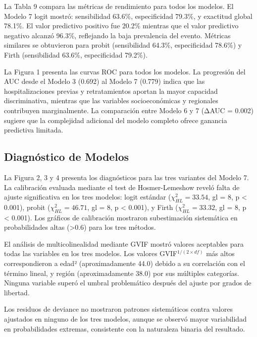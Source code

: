 \documentclass[
  spanish,
  10pt,
]{article}
\begin{document}
La Tabla 9 compara las métricas de rendimiento para todos los modelos.
El Modelo 7 logit mostró: sensibilidad 63.6\%, especificidad 79.3\%, y
exactitud global 78.1\%. El valor predictivo positivo fue 20.2\%
mientras que el valor predictivo negativo alcanzó 96.3\%, reflejando la
baja prevalencia del evento. Métricas similares se obtuvieron para
probit (sensibilidad 64.3\%, especificidad 78.6\%) y Firth (sensibilidad
63.6\%, especificidad 79.2\%).

La Figura 1 presenta las curvas ROC para todos los modelos. La
progresión del AUC desde el Modelo 3 (0.692) al Modelo 7 (0.779) indica
que las hospitalizaciones previas y retratamientos aportan la mayor
capacidad discriminativa, mientras que las variables socioeconómicas y
regionales contribuyen marginalmente. La comparación entre Modelo 6 y 7
(ΔAUC = 0.002) sugiere que la complejidad adicional del modelo completo
ofrece ganancia predictiva limitada.

\subsection{Diagnóstico de Modelos}\label{diagnuxf3stico-de-modelos}

La Figura 2, 3 y 4 presenta los diagnósticos para las tres variantes del
Modelo 7. La calibración evaluada mediante el test de Hosmer-Lemeshow
reveló falta de ajuste significativa en los tres modelos: logit estándar
(\(\chi^2_{HL} = 33.54\), gl = 8, p \textless{} 0.001), probit
(\(\chi^2_{HL} = 46.71\), gl = 8, p \textless{} 0.001), y Firth
(\(\chi^2_{HL} = 33.32\), gl = 8, p \textless{} 0.001). Los gráficos de
calibración mostraron subestimación sistemática en probabilidades altas
(\textgreater0.6) para los tres métodos.

El análisis de multicolinealidad mediante GVIF mostró valores aceptables
para todas las variables en los tres modelos. Los valores
GVIF\(^{1/(2 \times df)}\) más altos correspondieron a edad²
(aproximadamente 44.0) debido a su correlación con el término lineal, y
región (aproximadamente 38.0) por sus múltiples categorías. Ninguna
variable superó el umbral problemático después del ajuste por grados de
libertad.

Los residuos de deviance no mostraron patrones sistemáticos contra
valores ajustados en ninguno de los tres modelos, aunque se observó
mayor variabilidad en probabilidades extremas, consistente con la
naturaleza binaria del resultado.

\newpage
\end{document}
